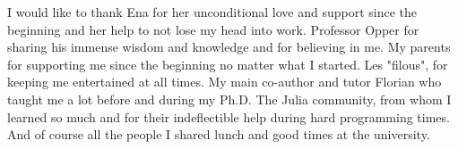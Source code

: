 

\begin{acknowledgements}      %

I would like to thank Ena for her unconditional love and support since the beginning and her help to not lose my head into work.
Professor Opper for sharing his immense wisdom and knowledge and for believing in me. 
My parents for supporting me since the beginning no matter what I started.
Les "filous", for keeping me entertained at all times.  
My main co-author and tutor Florian who taught me a lot before and during my Ph.D.
The Julia community, from whom I learned so much and for their indeflectible help during hard programming times.
And of course all the people I shared lunch and good times at the university.


\end{acknowledgements}



